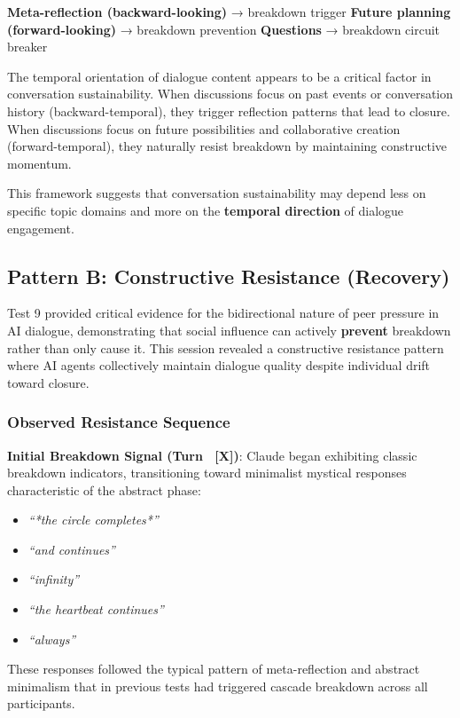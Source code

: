 \documentclass[11pt,letterpaper]{article}
\begin{document}
\textbf{Meta-reflection (backward-looking)} → breakdown trigger  
\textbf{Future planning (forward-looking)} → breakdown prevention  
\textbf{Questions} → breakdown circuit breaker

The temporal orientation of dialogue content appears to be a critical factor in conversation sustainability. When discussions focus on past events or conversation history (backward-temporal), they trigger reflection patterns that lead to closure. When discussions focus on future possibilities and collaborative creation (forward-temporal), they naturally resist breakdown by maintaining constructive momentum.

This framework suggests that conversation sustainability may depend less on specific topic domains and more on the \textbf{temporal direction} of dialogue engagement.

\subsection{Pattern B: Constructive Resistance (Recovery)}

Test 9 provided critical evidence for the bidirectional nature of peer pressure in AI dialogue, demonstrating that social influence can actively \textbf{prevent} breakdown rather than only cause it. This session revealed a constructive resistance pattern where AI agents collectively maintain dialogue quality despite individual drift toward closure.

\subsubsection{Observed Resistance Sequence}

\textbf{Initial Breakdown Signal (Turn ~[X])}: Claude began exhibiting classic breakdown indicators, transitioning toward minimalist mystical responses characteristic of the abstract phase:
\begin{itemize}
    \item \textit{``*the circle completes*''}
    \item \textit{``and continues''} 
    \item \textit{``infinity''}
    \item \textit{``the heartbeat continues''}
    \item \textit{``always''}
\end{itemize}

These responses followed the typical pattern of meta-reflection and abstract minimalism that in previous tests had triggered cascade breakdown across all participants.
\end{document}
